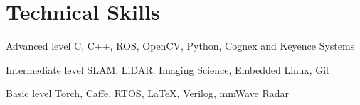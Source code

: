 \documentclass{tccv}
\begin{document}
\section{Technical Skills}
\begin{factlist}

\item{Advanced  level}
     {C, C++, ROS, OpenCV, Python, Cognex and Keyence Systems}

\item{Intermediate level}
     {SLAM, LiDAR, Imaging Science, Embedded Linux, Git}

\item{Basic level}
     {Torch, Caffe, RTOS, \LaTeX, Verilog, mmWave Radar}

\end{factlist}
\end{document}
